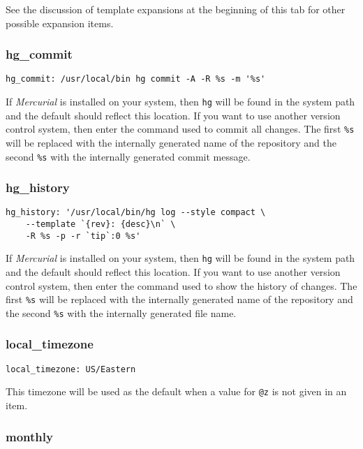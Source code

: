 \documentclass[]{article}
\begin{document}
See the discussion of template expansions at the beginning of this tab
for other possible expansion items.

\subsubsection{hg\_commit}

\begin{verbatim}
hg_commit: /usr/local/bin hg commit -A -R %s -m '%s'
\end{verbatim}

If \emph{Mercurial} is installed on your system, then \texttt{hg} will
be found in the system path and the default should reflect this
location. If you want to use another version control system, then enter
the command used to commit all changes. The first \texttt{\%s} will be
replaced with the internally generated name of the repository and the
second \texttt{\%s} with the internally generated commit message.

\subsubsection{hg\_history}

\begin{verbatim}
hg_history: '/usr/local/bin/hg log --style compact \
    --template `{rev}: {desc}\n` \
    -R %s -p -r `tip`:0 %s'
\end{verbatim}

If \emph{Mercurial} is installed on your system, then \texttt{hg} will
be found in the system path and the default should reflect this
location. If you want to use another version control system, then enter
the command used to show the history of changes. The first \texttt{\%s}
will be replaced with the internally generated name of the repository
and the second \texttt{\%s} with the internally generated file name.

\subsubsection{local\_timezone}

\begin{verbatim}
local_timezone: US/Eastern
\end{verbatim}

This timezone will be used as the default when a value for \texttt{@z}
is not given in an item.

\subsubsection{monthly}
\end{document}
